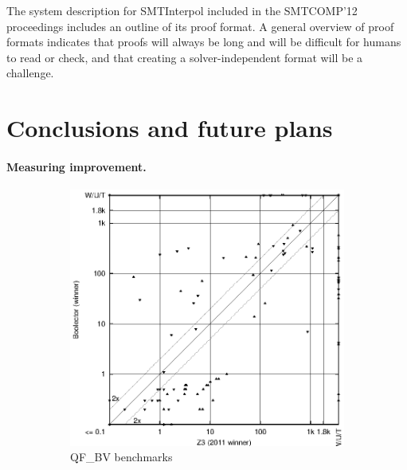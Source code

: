 \documentclass{llncs}
\begin{document}
The system description for SMTInterpol included in the SMTCOMP'12 proceedings includes an outline of its proof format. A general overview of proof formats indicates that proofs will always be long and will be difficult for humans to read or check, and that creating a solver-independent format will be a challenge.

\section{Conclusions and future plans}

\paragraph{Measuring improvement.}


\begin{figure}[ht]
\centering
\begin{subfigure}{0.45\textwidth}
	   \includegraphics[width=1\textwidth]{QF_BV-scatter-improvement.eps}
	   \caption{QF\_BV benchmarks}
	\end{subfigure}
\begin{subfigure}{0.45\textwidth}

\end{subfigure}
\end{figure}
\end{document}
